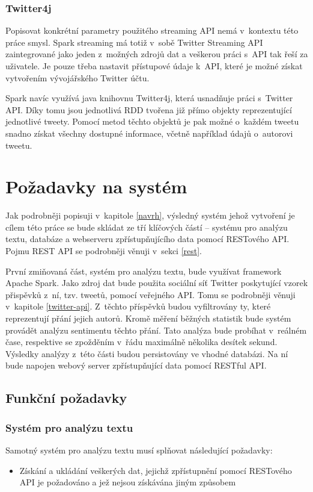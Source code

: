 \documentclass[thesis=B,czech]{FITthesis}[2012/06/26]
\begin{document}
\subsubsection{Twitter4j}
	Popisovat konkrétní parametry použitého streaming API nemá v~kontextu této práce smysl. Spark streaming má totiž v~sobě Twitter Streaming API zaintegrované jako jeden z~možných zdrojů dat a veškerou práci s~API tak řeší za uživatele. Je pouze třeba nastavit přístupové údaje k~API, které je možné získat vytvořením vývojářského Twitter účtu. 
	
	Spark navíc využívá java knihovnu Twitter4j\cite{twitter4j}, která usnadňuje práci s~Twitter API. Díky tomu jsou jednotlivá RDD tvořena již přímo objekty reprezentující jednotlivé tweety. Pomocí metod těchto objektů je pak možné o~každém tweetu snadno získat všechny dostupné informace, včetně například údajů o~autorovi tweetu. 


\section{Požadavky na systém}
\label{pozadavky}
	Jak podrobněji popisuji v~kapitole \ref{navrh}, výsledný systém jehož vytvoření je cílem této práce se bude skládat ze tří klíčových částí -- systému pro analýzu textu, databáze a webserveru zpřístupňujícího data pomocí RESTového API. Pojmu REST API se podrobněji věnuji v~sekci \ref{rest}. 
	
	 První zmiňovaná část, systém pro analýzu textu, bude využívat framework Apache Spark. Jako zdroj dat bude použita sociální síť Twitter poskytující vzorek přispěvků z~ní, tzv. tweetů, pomocí veřejného API. Tomu se podrobněji věnuji v~kapitole \ref{twitter-api}. Z~těchto příspěvků budou vyfiltrovány ty, které reprezentují přání jejich autorů. Kromě měření běžných statistik bude systém provádět analýzu sentimentu těchto přání. Tato analýza bude probíhat v~reálném čase, respektive se zpožděním v~řádu maximálně několika desítek sekund.  Výsledky analýzy z~této části budou persistovány ve vhodné databázi. Na ní bude napojen webový server zpřístupňující data pomocí RESTful API. 

\subsection{Funkční požadavky}
\subsubsection{Systém pro analýzu textu}
Samotný systém pro analýzu textu musí splňovat následující požadavky:
\begin{itemize}
\item Získání a ukládání veškerých dat, jejichž zpřístupnění pomocí RESTového API je požadováno a jež nejsou získávána jiným způsobem
\end{itemize}
\end{document}
